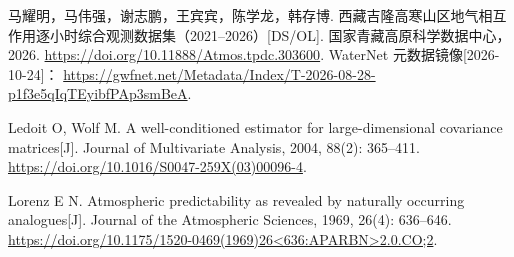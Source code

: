 马耀明，马伟强，谢志鹏，王宾宾，陈学龙，韩存博.
西藏吉隆高寒山区地气相互作用逐小时综合观测数据集（2021--2026）[DS/OL].
国家青藏高原科学数据中心，2026.
\url{https://doi.org/10.11888/Atmos.tpdc.303600}.
WaterNet 元数据镜像[2026-10-24]：
\url{https://gwfnet.net/Metadata/Index/T-2026-08-28-p1f3e5qIqTEyibfPAp3smBeA}.

Ledoit O, Wolf M.
A well-conditioned estimator for large-dimensional covariance matrices[J].
Journal of Multivariate Analysis, 2004, 88(2): 365--411.
\url{https://doi.org/10.1016/S0047-259X(03)00096-4}.

Lorenz E N.
Atmospheric predictability as revealed by naturally occurring analogues[J].
Journal of the Atmospheric Sciences, 1969, 26(4): 636--646.
\url{https://doi.org/10.1175/1520-0469(1969)26<636:APARBN>2.0.CO;2}.
